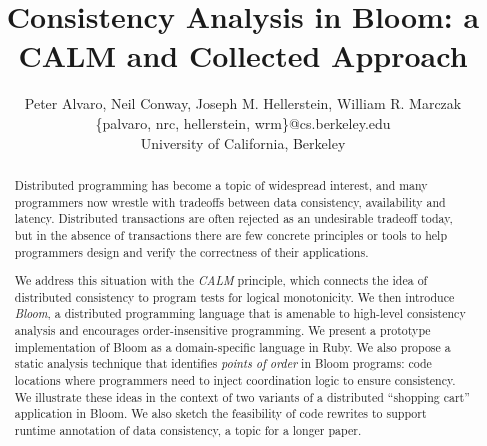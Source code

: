 \documentclass{sig-alternate}
\begin{document}
\title{Consistency Analysis in Bloom: a CALM and Collected Approach}

\author{
Peter Alvaro, Neil Conway, Joseph M. Hellerstein, William R. Marczak \vspace{12pt} \\
\{palvaro, nrc, hellerstein, wrm\}@cs.berkeley.edu \\
University of California, Berkeley
}

\maketitle

\begin{abstract}
  Distributed programming has become a topic of widespread interest, and many
  programmers now wrestle with tradeoffs between data consistency, availability
  and latency.  Distributed transactions are often rejected as an undesirable
  tradeoff today, but in the absence of transactions there are few concrete
  principles or tools to help programmers design and verify the correctness of
  their applications.

  We address this situation with the \emph{CALM} principle, which connects the
  idea of distributed consistency to program tests for logical monotonicity.  We
  then introduce \emph{Bloom}, a distributed programming language that is
  amenable to high-level consistency analysis and encourages order-insensitive
  programming.  We present a prototype implementation of Bloom as a
  domain-specific language in Ruby. We also propose a static analysis technique
  that identifies {\em points of order} in Bloom programs: code locations where
  programmers need to inject coordination logic to ensure consistency.  We
  illustrate these ideas in the context of two variants of a distributed
  ``shopping cart'' application in Bloom.  We also sketch the feasibility of
  code rewrites to support runtime annotation of data consistency, a topic for a
  longer paper.
\end{abstract}














\appendix

\end{document}
